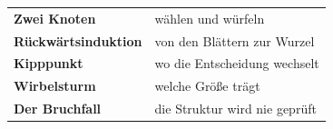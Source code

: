 \begin{merksatz}
\begin{center}
\renewcommand{\arraystretch}{1.5}
\begin{tabular}{@{}P{3.6cm}P{5.0cm}@{}}
\toprule
\textbf{Zwei Knoten} & wählen und würfeln\\
\textbf{Rückwärtsinduktion} & von den Blättern zur Wurzel\\
\textbf{Kipppunkt} & wo die Entscheidung wechselt\\
\textbf{Wirbelsturm} & welche Größe trägt\\
\textbf{Der Bruchfall} & die Struktur wird nie geprüft\\
\bottomrule
\end{tabular}
\end{center}

\begin{center}
\begin{minipage}{0.88\textwidth}
\end{minipage}
\end{center}
\end{merksatz}
